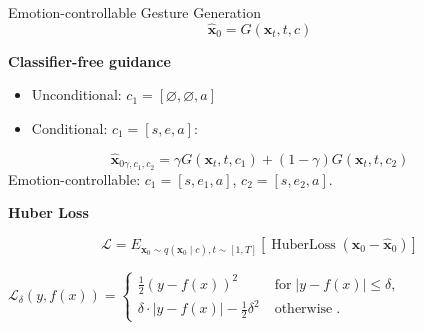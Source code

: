 \begin{frame}{Emotion-controllable Gesture Generation}
	\begin{equation} \label{eq:condition}
		\hat{\mathbf{x}}_{0} = G \left(\mathbf{x}_{t}, t, c\right)
	\end{equation}
	
	\textbf{Classifier-free guidance}
	\begin{itemize}
		\item Unconditional: $c_1 = [ \varnothing, \varnothing, a ]$
		\item Conditional: $c_1 = [ s, e, a ]$:
	\end{itemize}
	\begin{equation} \label{eq:denoise}
		\hat{\mathbf{x}}_{0 \gamma, c_{1}, c_{2}}=\gamma G \left(\mathbf{x}_{t}, t, c_{1}\right)+(1-\gamma) G \left(\mathbf{x}_{t}, t, c_{2}\right)
	\end{equation}
	Emotion-controllable: $c_1 = [ s, e_1, a ]$, $c_2 = [ s, e_2, a ]$.
	
	\textbf{Huber Loss}
	
	\begin{equation} \label{eq:huberloss}
		\mathcal{L}=E_{\mathbf{x}_{0} \sim q\left(\mathbf{x}_{0} \mid c\right), t \sim[1, T]}\left[\operatorname{HuberLoss}\left(\mathbf{x}_{0}-\hat{\mathbf{x}}_{0}\right)\right]
	\end{equation}
	
	$\mathcal{L}_{\delta}(y, f(x)) = 
	\begin{cases} 
		\frac{1}{2} (y - f(x))^2 & \operatorname{for } |y - f(x)| \leq \delta, \\
		\delta \cdot |y - f(x)| - \frac{1}{2} \delta^2 & \operatorname{otherwise}.
	\end{cases}
	$
	
\end{frame}





%	
%	
%	
%	

